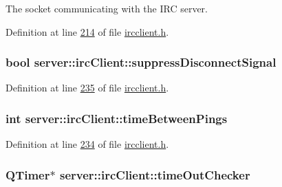 The socket communicating with the I\-R\-C server. 



Definition at line \hyperlink{ircclient_8h_source_l00214}{214} of file \hyperlink{ircclient_8h_source}{ircclient.\-h}.

\hypertarget{classserver_1_1irc_client_a6aa6b409d9ef795a021d9e7bd44149d6}{
\subsubsection[{suppress\-Disconnect\-Signal}]{\setlength{\rightskip}{0pt plus 5cm}bool server\-::irc\-Client\-::suppress\-Disconnect\-Signal\hspace{0.3cm}{\ttfamily [private]}}}\label{d1/d10/classserver_1_1irc_client_a6aa6b409d9ef795a021d9e7bd44149d6}


Definition at line \hyperlink{ircclient_8h_source_l00235}{235} of file \hyperlink{ircclient_8h_source}{ircclient.\-h}.

\hypertarget{classserver_1_1irc_client_a71861748a52a4f4af0fba8652f440841}{
\subsubsection[{time\-Between\-Pings}]{\setlength{\rightskip}{0pt plus 5cm}int server\-::irc\-Client\-::time\-Between\-Pings\hspace{0.3cm}{\ttfamily [private]}}}\label{d1/d10/classserver_1_1irc_client_a71861748a52a4f4af0fba8652f440841}


Definition at line \hyperlink{ircclient_8h_source_l00234}{234} of file \hyperlink{ircclient_8h_source}{ircclient.\-h}.

\hypertarget{classserver_1_1irc_client_a3ad9869f193bd5218c0fa2bf2c73377f}{
\subsubsection[{time\-Out\-Checker}]{\setlength{\rightskip}{0pt plus 5cm}Q\-Timer$\ast$ server\-::irc\-Client\-::time\-Out\-Checker\hspace{0.3cm}{\ttfamily [private]}}}\label{d1/d10/classserver_1_1irc_client_a3ad9869f193bd5218c0fa2bf2c73377f}


